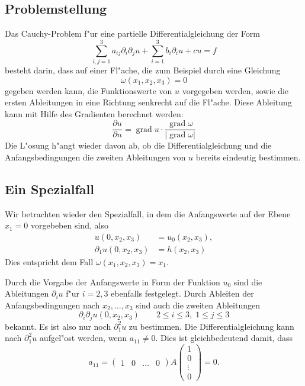 \subsection{Problemstellung}
Das Cauchy-Problem f"ur eine partielle Differentialgleichung der
Form
\[
\sum_{i,j=1}^3a_{ij}\partial_i\partial_ju+\sum_{i=1}^3b_i\partial_iu+cu=f
\]
besteht darin, dass auf einer Fl"ache, die zum Beispiel durch
eine Gleichung
\[
\omega(x_1,x_2,x_3)=0
\]
gegeben werden kann,
die Funktionswerte von $u$ vorgegeben werden, sowie die ersten
Ableitungen in eine Richtung senkrecht auf die Fl"ache.
Diese Ableitung kann mit Hilfe des Gradienten berechnet werden:
\[
\frac{\partial u}{\partial n}=\operatorname{grad}u\cdot \frac{\operatorname{grad}\omega}{|\operatorname{grad}\omega|}
\]
Die L"osung h"angt wieder davon ab, ob die Differentialgleichung
und die Anfangsbedingungen die zweiten Ableitungen von $u$ bereits
eindeutig bestimmen.

\subsection{Ein Spezialfall}
Wir betrachten wieder den Spezialfall, in dem die Anfangswerte auf der
Ebene $x_1=0$ vorgebeben sind, also
\begin{align*}
u(0,x_2,x_3)&=u_0(x_2,x_3),
\\
\partial_1u(0,x_2,x_3)&=h(x_2,x_3)
\end{align*}
Dies entspricht dem Fall $\omega(x_1,x_2,x_3)=x_1$.

Durch die Vorgabe der Anfangswerte in Form der Funktion $u_0$ sind die Ableitungen
$\partial_iu$ f"ur $i=2,3$ ebenfalls festgelegt.
Durch Ableiten der Anfangsbedingungen nach $x_2,\dots,x_3$
sind auch die zweiten Ableitungen 
\[
\partial_i\partial_ju(0,x_2,x_3)\qquad 2\le i\le 3,\;1\le j\le 3
\]
bekannt. Es ist also nur noch $\partial_1^2u$ zu bestimmen.
Die Differentialgleichung kann nach $\partial_1^2u$ aufgel"ost
werden, wenn $a_{11}\ne 0$. Dies ist gleichbedeutend damit, dass
\[
a_{11}=\begin{pmatrix}
1&0&\dots&0
\end{pmatrix}
A
\begin{pmatrix}1\\0\\\vdots\\0\end{pmatrix}
=0.
\]

